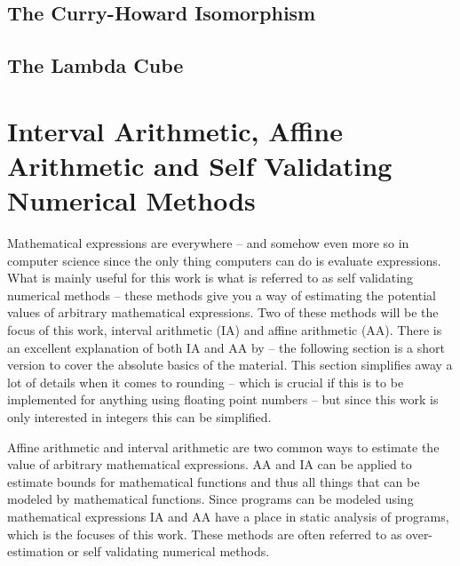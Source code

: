 \subsection{The Curry-Howard Isomorphism}

\subsection{The Lambda Cube}

\section{Interval Arithmetic, Affine Arithmetic and Self Validating Numerical Methods}
\label{sec:IAndAA}

Mathematical expressions are everywhere -- and somehow even more so in computer science since the only thing computers can do is evaluate expressions. What is mainly useful for this work is what is referred to as self validating numerical methods -- these methods give you a way of estimating the potential values of arbitrary mathematical expressions. Two of these methods will be the focus of this work, interval arithmetic (IA) and affine arithmetic (AA). There is an excellent explanation of both IA and AA by \citeauthor{src:affAri}\cite{src:affAri} -- the following section is a short version to cover the absolute basics of the material. This section simplifies away a lot of details when it comes to rounding -- which is crucial if this is to be implemented for anything using floating point numbers -- but since this work is only interested in integers this can be simplified.

Affine arithmetic and interval arithmetic are two common ways to estimate the value of arbitrary mathematical expressions. AA and IA can be applied to estimate bounds for mathematical functions and thus all things that can be modeled by mathematical functions. Since programs can be modeled using mathematical expressions IA and AA have a place in static analysis of programs, which is the focuses of this work. These methods are often referred to as over-estimation or self validating numerical methods.


